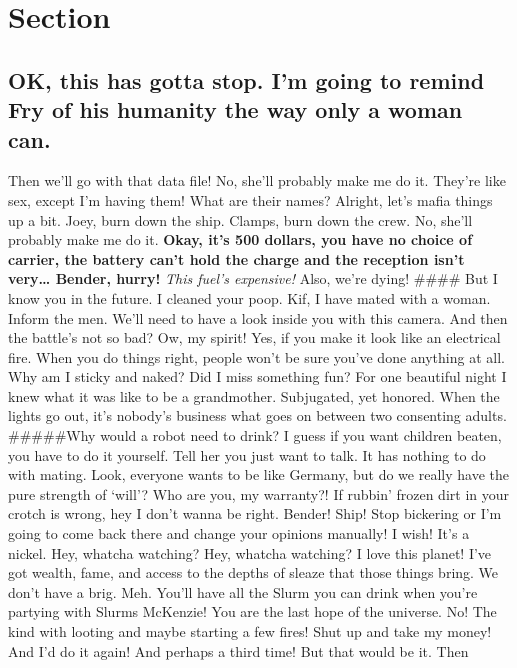 \section{Section}\label{section-2.2}

\subsection{OK, this has gotta stop. I'm going to remind Fry of his
humanity the way only a woman
can.}\label{ok-this-has-gotta-stop.-im-going-to-remind-fry-of-his-humanity-the-way-only-a-woman-can.}

Then we'll go with that data file! No, she'll probably make me do it.
They're like sex, except I'm having them! What are their names? Alright,
let's mafia things up a bit. Joey, burn down the ship. Clamps, burn down
the crew. No, she'll probably make me do it. \textbf{Okay, it's 500
dollars, you have no choice of carrier, the battery can't hold the
charge and the reception isn't very\ldots{} Bender, hurry!} \emph{This
fuel's expensive!} Also, we're dying! \#\#\#\# But I know you in the
future. I cleaned your poop. Kif, I have mated with a woman. Inform the
men. We'll need to have a look inside you with this camera. And then the
battle's not so bad? Ow, my spirit! Yes, if you make it look like an
electrical fire. When you do things right, people won't be sure you've
done anything at all. Why am I sticky and naked? Did I miss something
fun? For one beautiful night I knew what it was like to be a
grandmother. Subjugated, yet honored. When the lights go out, it's
nobody's business what goes on between two consenting adults.
\#\#\#\#\#Why would a robot need to drink?\newline
I guess if you want children beaten, you have to do it yourself. Tell
her you just want to talk. It has nothing to do with mating. Look,
everyone wants to be like Germany, but do we really have the pure
strength of `will'? Who are you, my warranty?! If rubbin' frozen dirt in
your crotch is wrong, hey I don't wanna be right. Bender! Ship! Stop
bickering or I'm going to come back there and change your opinions
manually! I wish! It's a nickel. Hey, whatcha watching? Hey, whatcha
watching? I love this planet! I've got wealth, fame, and access to the
depths of sleaze that those things bring. We don't have a brig. Meh.
You'll have all the Slurm you can drink when you're partying with Slurms
McKenzie! You are the last hope of the universe. No! The kind with
looting and maybe starting a few fires! Shut up and take my money! And
I'd do it again! And perhaps a third time! But that would be it. Then
